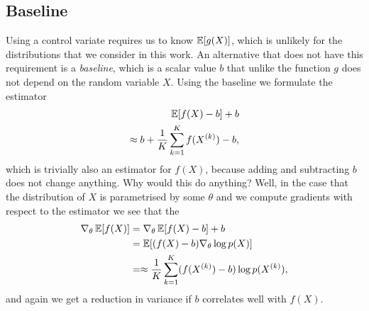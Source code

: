 \begin{example}{\citep{ross2006simulation}}
  \subsection{Baseline}
    Using a control variate requires us to know $\operatorname{\mathbb{E}} [ g(X) ]$, which is unlikely for the distributions that we consider in this work. An alternative that does not have this requirement is a \textit{baseline}, which is a scalar value $b$ that unlike the function $g$ does not depend on the random variable $X$. Using the baseline we formulate the estimator
    \begin{align}
      \operatorname{\mathbb{E}} [ f(X) - b ] + b  \\
        \approx b + \frac{1}{K} \sum_{k=1}^K f(X^{(k)}) - b,
    \end{align}
    which is trivially also an estimator for $f(X)$, because adding and subtracting $b$ does not change anything. Why would this do anything? Well, in the case that the distribution of $X$ is parametrised by some $\theta$ and we compute gradients with respect to the estimator we see that the
    \begin{align}
      \nabla_{\theta} \operatorname{\mathbb{E}} [ f(X) ]
        &= \nabla_{\theta} \operatorname{\mathbb{E}} [ f(X) - b ] + b  \\
        &= \operatorname{\mathbb{E}} [ (f(X) - b) \nabla_{\theta} \log p(X) ]  \\
        &= \approx \frac{1}{K} \sum_{k=1}^K (f(X^{(k)}) - b) \log p(X^{(k)}),
    \end{align}
    and again we get a reduction in variance if $b$ correlates well with $f(X)$.


\end{example}
